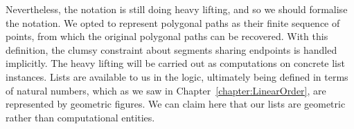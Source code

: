 



Nevertheless, the notation is still doing heavy lifting, and so we should formalise the notation. We opted to represent polygonal paths as their finite sequence of points, from which the original polygonal paths can be recovered. With this definition, the clumsy constraint about segments sharing endpoints is handled implicitly. The heavy lifting will be carried out as computations on concrete list instances. Lists are available to us in the logic, ultimately being defined in terms of natural numbers, which as we saw in Chapter~\ref{chapter:LinearOrder}, are represented by geometric figures. We can claim here that our lists are geometric rather than computational entities.


